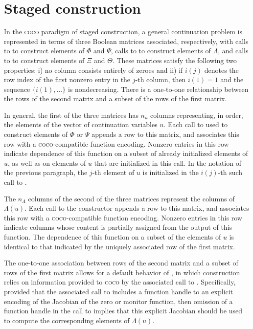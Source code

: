 \section{Staged construction}

In the \textsc{coco} paradigm of staged construction, a general continuation problem is represented in terms of three Boolean matrices associated, respectively, with calls to  to construct elements of $\Phi$ and $\Psi$, calls to  to construct elements of $\Lambda$, and calls to  to construct elements of $\Xi$ and $\Theta$. These matrices satisfy the following two properties: i) no column consists entirely of zeroes and ii) if $i(j)$ denotes the row index of the first nonzero entry in the $j$-th column, then $i(1)=1$ and the sequence $\{i(1),\ldots\}$ is nondecreasing. There is a one-to-one relationship between the rows of the second matrix and a subset of the rows of the first matrix. 

In general, the first of the three matrices has $n_u$ columns representing, in order, the elements of the vector of continuation variables $u$. Each call to  used to construct elements of $\Phi$ or $\Psi$ appends a row to this matrix, and associates this row with a \textsc{coco}-compatible function encoding. Nonzero entries in this row indicate dependence of this function on a subset of already initialized elements of $u$, as well as on elements of $u$ that are initialized in this call. In the notation of the previous paragraph, the $j$-th element of $u$ is initialized in the $i(j)$-th such call to .

The $n_\Lambda$ columns of the second of the three matrices represent the columns of $\Lambda(u)$. Each call to the  constructor appends a row to this matrix, and associates this row with a \textsc{coco}-compatible function encoding. Nonzero entries in this row indicate columns whose content is partially assigned from the output of this function. The dependence of this function on a subset of the elements of $u$ is identical to that indicated by the uniquely associated row of the first matrix.

The one-to-one association between rows of the second matrix and a subset of rows of the first matrix allows for a default behavior of , in which construction relies on information provided to \textsc{coco} by the associated call to . Specifically, provided that the associated call to  includes a function handle to an explicit encoding of the Jacobian of the zero or monitor function, then omission of a function handle in the call to  implies that this explicit Jacobian should be used to compute the corresponding elements of $\Lambda(u)$.

